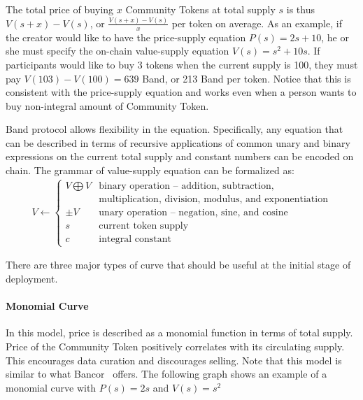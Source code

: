 \documentclass[letterpaper,11pt]{article}
\begin{document}
The total price of buying $x$ Community Tokens at total supply $s$ is thus $V(s+x)-V(s)$, or $\frac{V(s+x)-V(s)}{x}$ per token on average. As an example, if the creator would like to have the price-supply equation $P(s) = 2s + 10$, he or she must specify the on-chain value-supply equation $V(s) = s^2 + 10s$. If participants would like to buy 3 tokens when the current supply is 100, they must pay $V(103)-V(100) =639$ Band, or 213 Band per token. Notice that this is consistent with the price-supply equation and works even when a person wants to buy non-integral amount of Community Token.

Band protocol allows flexibility in the equation. Specifically, any equation that can be described in terms of recursive applications of common unary and binary expressions on the current total supply and constant numbers can be encoded on chain. The grammar of value-supply equation can be formalized as:
\begin{align*}
V \leftarrow
\begin{cases}
V \bigoplus V & \text{binary operation -- addition, subtraction, } \\
& \text{multiplication, division, modulus, and exponentiation} \\
\pm V & \text{unary operation -- negation, sine, and cosine} \\
s & \text{current token supply} \\
c & \text{integral constant}
\end{cases}
\end{align*}

There are three major types of curve that should be useful at the initial stage of deployment.
\paragraph{Monomial Curve} In this model, price is described as a monomial function in terms of total supply. Price of the Community Token positively correlates with its circulating supply. This encourages data curation and discourages selling. Note that this model is similar to what Bancor~\cite{bancorwhitepaper} offers. The following graph shows an example of a monomial curve with $P(s) = 2s$ and $V(s) = s^2$

\begin{center}
\end{center}
\end{document}

